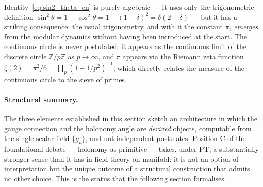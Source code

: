 Identity~\eqref{eq:sin2_theta_en} is purely algebraic --- it uses
only the trigonometric definition
$\sin^2 \theta = 1 - \cos^2 \theta = 1 - (1 - \delta)^2 =
\delta (2 - \delta)$ --- but it has a striking consequence: the
usual trigonometry, and with it the constant $\pi$, \emph{emerges}
from the modular dynamics without having been introduced at the
start. The continuous circle is never postulated; it appears as
the continuous limit of the discrete circle
$\mathbb{Z}/p\mathbb{Z}$ as $p \to \infty$, and $\pi$ appears via
the Riemann zeta function $\zeta(2) = \pi^2/6 =
\prod_p (1 - 1/p^2)^{-1}$, which directly relates the measure of
the continuous circle to the sieve of primes.

\paragraph{Structural summary.}
The three elements established in this section sketch an
architecture in which the gauge connection and the holonomy
angle are \emph{derived} objects, computable from the single
scalar field $\{g_n\}$, and not independent postulates. Position
C of the foundational debate --- holonomy as primitive --- takes,
under PT, a substantially stronger sense than it has in field
theory on manifold: it is not an option of interpretation but
the unique outcome of a structural construction that admits no
other choice. This is the status that the following section
formalises.
